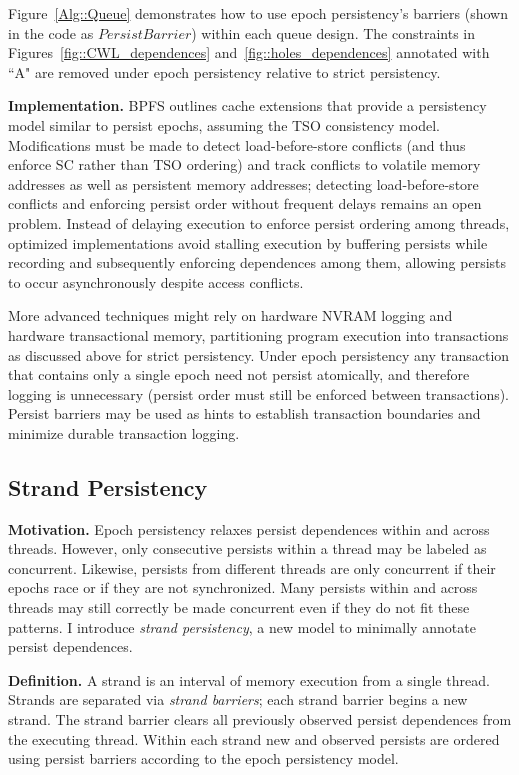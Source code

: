 Figure~\ref{Alg::Queue} demonstrates how to use epoch persistency's barriers (shown in the code as $PersistBarrier$) within each queue design.
The constraints in Figures~\ref{fig::CWL_dependences} and~\ref{fig::holes_dependences} annotated with ``A" are removed under epoch persistency relative to strict persistency.

\textbf{Implementation.}
BPFS \cite{ConditNightingale09} outlines cache extensions that provide a persistency model similar to persist epochs, assuming the TSO consistency model.
Modifications must be made to detect load-before-store conflicts (and thus enforce SC rather than TSO ordering) and track conflicts to volatile memory addresses as well as persistent memory addresses; detecting load-before-store conflicts and enforcing persist order without frequent delays remains an open problem.
Instead of delaying execution to enforce persist ordering among threads, optimized implementations avoid stalling execution by buffering persists while recording and subsequently enforcing dependences among them, allowing persists to occur asynchronously despite access conflicts.

More advanced techniques might rely on hardware NVRAM logging and hardware transactional memory, partitioning program execution into transactions as discussed above for strict persistency.
Under epoch persistency any transaction that contains only a single epoch need not persist atomically, and therefore logging is unnecessary (persist order must still be enforced between transactions).
Persist barriers may be used as hints to establish transaction boundaries and minimize durable transaction logging.

\subsection{Strand Persistency}
\label{section:PersistencyModels:PersistStrands}

\textbf{Motivation.}
Epoch persistency relaxes persist dependences within and across threads.
However, only consecutive persists within a thread may be labeled as concurrent.
Likewise, persists from different threads are only concurrent if their epochs race or if they are not synchronized.
Many persists within and across threads may still correctly be made concurrent even if they do not fit these patterns.
I introduce \emph{strand persistency}, a new model to minimally annotate persist dependences.

\textbf{Definition.}
A strand is an interval of memory execution from a single thread.
Strands are separated via \emph{strand barriers}; each strand barrier begins a new strand.
The strand barrier clears all previously observed persist dependences from the executing thread.
Within each strand new and observed persists are ordered using persist barriers according to the epoch persistency model.

